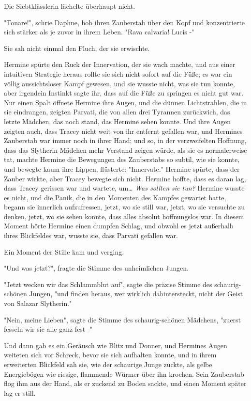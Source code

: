{Die Siebtklässlerin lächelte überhaupt nicht.

"Tonare!", schrie Daphne, hob ihren Zauberstab über den Kopf und konzentrierte sich stärker als je zuvor in ihrem Leben. "Rava calvaria! Lucis -"

Sie sah nicht einmal den Fluch, der sie erwischte.

Hermine spürte den Ruck der Innervation, der sie wach machte, und aus einer intuitiven Strategie heraus rollte sie sich nicht sofort auf die Füße; es war ein völlig aussichtsloser Kampf gewesen, und sie wusste nicht, was sie tun konnte, aber irgendein Instinkt sagte ihr, dass auf die Füße zu springen es nicht gut war. Nur einen Spalt öffnete Hermine ihre Augen, und die dünnen Lichtstrahlen, die in sie eindrangen, zeigten Parvati, die von allen drei Tyrannen zurückwich, das letzte Mädchen, das noch stand, das Hermine sehen konnte. Und ihre Augen zeigten auch, dass Tracey nicht weit von ihr entfernt gefallen war, und Hermines Zauberstab war immer noch in ihrer Hand; und so, in der verzweifelten Hoffnung, dass das Slytherin-Mädchen mehr Verstand zeigen würde, als sie es normalerweise tat, machte Hermine die Bewegungen des Zauberstabs so subtil, wie sie konnte, und bewegte kaum ihre Lippen, flüsterte: "Innervate." Hermine spürte, dass der Zauber wirkte, aber Tracey bewegte sich nicht. Hermine hoffte, dass es daran lag, dass Tracey gerissen war und wartete, um… \emph{Was sollten sie tun?} Hermine wusste es nicht, und die Panik, die in den Momenten des Kampfes gewartet hatte, begann sie innerlich aufzufressen, jetzt, wo sie still war, jetzt, wo sie versuchte zu denken, jetzt, wo sie sehen konnte, dass alles absolut hoffnungslos war. In diesem Moment hörte Hermine einen dumpfen Schlag, und obwohl es jetzt außerhalb ihres Blickfeldes war, wusste sie, dass Parvati gefallen war.

Ein Moment der Stille kam und verging.

"Und was jetzt?", fragte die Stimme des unheimlichen Jungen.

"Jetzt wecken wir das Schlammblut auf", sagte die präzise Stimme des schaurig-schönen Jungen, "und finden heraus, wer wirklich dahintersteckt, nicht der Geist von Salazar Slytherin."

"Nein, meine Lieben", sagte die Stimme des schaurig-schönen Mädchens, "zuerst fesseln wir sie alle ganz fest -"

Und dann gab es ein Geräusch wie Blitz und Donner, und Hermines Augen weiteten sich vor Schreck, bevor sie sich aufhalten konnte, und in ihrem erweiterten Blickfeld sah sie, wie der schaurige Junge zuckte, als gelbe Energiebögen wie riesige, flammende Würmer über ihn krochen. Sein Zauberstab flog ihm aus der Hand, als er zuckend zu Boden sackte, und einen Moment später lag er still.

}

